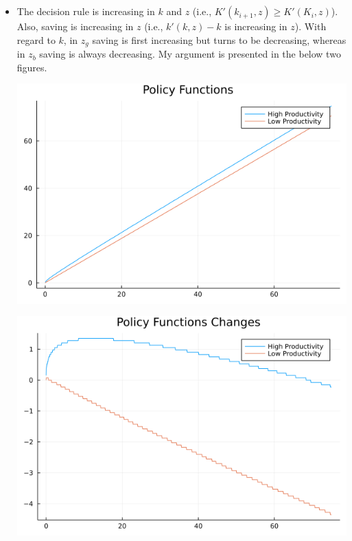 \documentclass[11pt]{article}
\theoremstyle{definition}
\theoremstyle{definition}
\theoremstyle{definition}
\theoremstyle{definition}
\theoremstyle{definition}
\theoremstyle{definition}
\begin{document}
\pagebreak

\section{}

\begin{itemize}
\item The decision rule is increasing in $k$ and $z$ (i.e., $K'(k_{i+1},z)\ge K'(K_{i},z)$). Also, saving is increasing in $z$ (i.e., $k'(k,z)-k$ is increasing in $z$). With regard to $k$, in $z_{g}$ saving is first increasing but turns to be decreasing, whereas in $z_{b}$ saving is always decreasing. My argument is presented in the below two figures.
\begin{center}
	\includegraphics[width=.8\linewidth]{./julia/figure_polfunc_julia.png}
\end{center}
\begin{center}
	\includegraphics[width=.8\linewidth]{./julia/figure_polfuncdiff_julia.png}
\end{center}

\pagebreak


\end{itemize}
\end{document}
